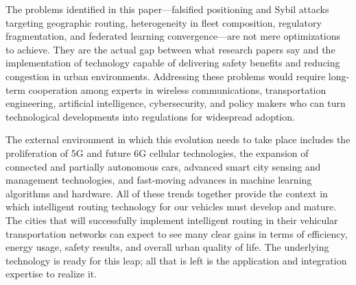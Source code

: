 \documentclass[12pt]{article}
\begin{document}
The problems identified in this paper—falsified positioning and Sybil attacks targeting geographic routing, heterogeneity in fleet composition, regulatory fragmentation, and federated learning convergence—are not mere optimizations to achieve. They are the actual gap between what research papers say and the implementation of technology capable of delivering safety benefits and reducing congestion in urban environments. Addressing these problems would require long-term cooperation among experts in wireless communications, transportation engineering, artificial intelligence, cybersecurity, and policy makers who can turn technological developments into regulations for widespread adoption.

The external environment in which this evolution needs to take place includes the proliferation of 5G and future 6G cellular technologies, the expansion of connected and partially autonomous cars, advanced smart city sensing and management technologies, and fast-moving advances in machine learning algorithms and hardware. All of these trends together provide the context in which intelligent routing technology for our vehicles must develop and mature. The cities that will successfully implement intelligent routing in their vehicular transportation networks can expect to see many clear gains in terms of efficiency, energy usage, safety results, and overall urban quality of life. The underlying technology is ready for this leap; all that is left is the application and integration expertise to realize it.




\end{document}
